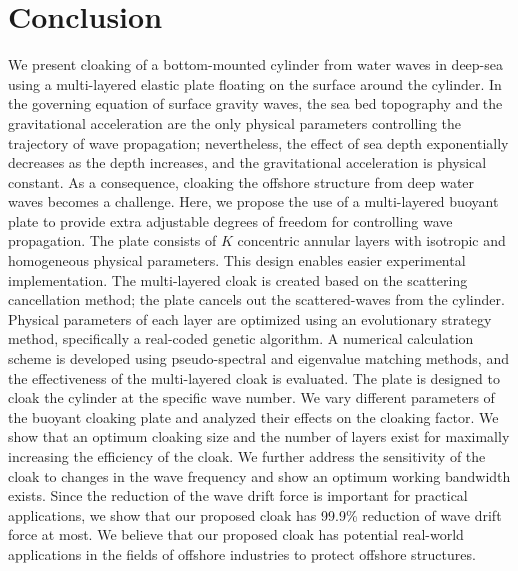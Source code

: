 \documentclass{jfm}
\begin{document}
\section{Conclusion}
%
We present cloaking of a bottom-mounted cylinder from water waves in deep-sea using a multi-layered elastic plate floating on the surface around the cylinder.
In the governing equation of surface gravity waves, the sea bed topography and the gravitational acceleration are the only physical parameters controlling the trajectory of wave propagation; nevertheless, the effect of sea depth exponentially decreases as the depth increases, and the gravitational acceleration is physical constant. As a consequence, cloaking the offshore structure from deep water waves becomes a challenge. Here, we propose the use of a multi-layered buoyant plate to provide extra adjustable degrees of freedom for controlling wave propagation.
The plate consists of $K$ concentric annular layers with isotropic and homogeneous physical parameters.
This design enables easier experimental implementation.
The multi-layered cloak is created based on the scattering cancellation method; the plate cancels out the scattered-waves from the cylinder.
Physical parameters of each layer are optimized using an evolutionary strategy method, specifically a real-coded genetic algorithm.
A numerical calculation scheme is developed using pseudo-spectral and eigenvalue matching methods, and the effectiveness of the multi-layered cloak is evaluated. The plate is designed to cloak the cylinder at the specific wave number. We vary different parameters of the buoyant cloaking plate and analyzed their effects on the cloaking factor. We show that an optimum cloaking size and the number of layers exist for maximally increasing the efficiency of the cloak. We further address the sensitivity of the cloak to changes in the wave frequency and show an optimum working bandwidth exists. Since the reduction of the wave drift force is important for practical applications, we show that our proposed cloak has 99.9\% reduction of wave drift force at most. We believe that our proposed cloak has potential real-world applications in the fields of offshore industries to protect offshore structures. 






%
%
%
%

\end{document}
